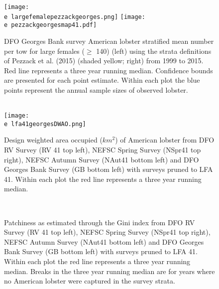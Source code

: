 \documentclass[11pt]{article}
\newcommand{\e}{/backup/bio_data/bio.lobster/figures/} %
\begin{document}
\begin{landscape}
\begin{figure}
\centering
    \texttt{[image: \\e largefemalepezzackgeorges.png]} 
     \texttt{[image: \\e pezzackgeorgesmap41.pdf]} 
    
    \caption{DFO Georges Bank survey American lobster stratified mean number per tow for large females ($\geq$ 140) (left) using the strata definitions of Pezzack et al. (2015) (shaded yellow; right) from 1999 to 2015. Red line represents a three year running median. Confidence bounds are presented for each point estimate. Within each plot the blue points represent the annual sample sizes of observed lobster.}

\end{figure}
\end{landscape}


\begin{figure}
\centering
{}
\\
    \texttt{[image: \\e lfa41georgesDWAO.png]}

\caption{Design weighted area occupied ($km^2$) of American lobster from DFO RV Survey (RV 41 top left), NEFSC Spring Survey (NSpr41 top right), NEFSC Autumn Survey (NAut41 bottom left) and DFO Georges Bank Survey (GB bottom left) with surveys pruned to LFA 41. Within each plot the red line represents a three year running median. }
\end{figure}
\clearpage


\begin{figure}
\centering
{}
\\

\caption{Patchiness as estimated through the Gini index from DFO RV Survey (RV 41 top left), NEFSC Spring Survey (NSpr41 top right), NEFSC Autumn Survey (NAut41 bottom left) and DFO Georges Bank Survey (GB bottom left) with surveys pruned to LFA 41. Within each plot the red line represents a three year running median. Breaks in the three year running median are for years where no American lobster were captured in the survey strata.}
\end{figure}
\clearpage
\end{document}
